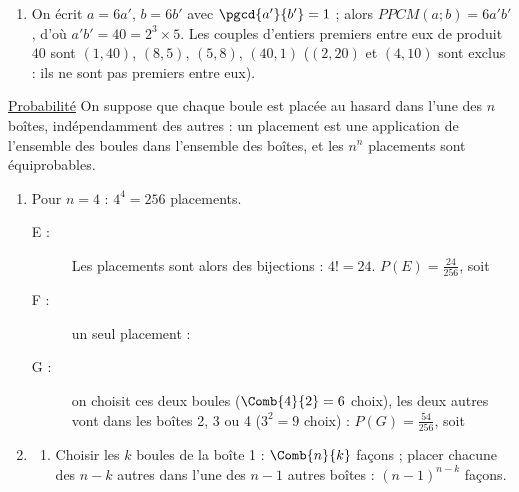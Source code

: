 \begin{description}
\begin{enumerate}
			$2^6 = 64 = 5 \times 11 + 9 \equiv 9 \pmod{11}$, donc $2^{6n+1} = 2 \times \left(2^6\right)^n \equiv 2 \times 9^n$.
			Ainsi $2^{6n+1} + 9^{n+1} \equiv 2 \times 9^n + 9 \times 9^n = 11 \times 9^n \equiv 0 \pmod{11}$.
			\par\noindent{}
		\item {}
			On écrit $a = 6a'$, $b = 6b'$ avec $\pgcd{a'}{b'} = 1$ ; alors $PPCM(a;b) = 6a'b'$, d'où $a'b' = 40 = 2^3 \times 5$.
			Les couples d'entiers premiers entre eux de produit $40$ sont $(1,40)$, $(8,5)$, $(5,8)$, $(40,1)$
			($(2,20)$ et $(4,10)$ sont exclus : ils ne sont pas premiers entre eux).
			\par\noindent{}
	\end{enumerate}
	\item[B.] \underline{Probabilité}
	On suppose que chaque boule est placée au hasard dans l'une des $n$ boîtes, indépendamment des autres : un placement est une application de l'ensemble des boules dans l'ensemble des boîtes, et les $n^n$ placements sont équiprobables.
	\begin{enumerate}
		\item Pour $n = 4$ : $4^4 = 256$ placements.
		\begin{description}
			\item[E :] 
				Les placements sont alors des bijections : $4! = 24$. $P(E) = \frac{24}{256}$, soit \par\noindent{}
			\item[F :] 
				un seul placement : \par\noindent{}
			\item[G :] 
				on choisit ces deux boules ($\Comb{4}{2} = 6$ choix), les deux autres vont dans les boîtes 2, 3 ou 4 ($3^2 = 9$ choix) :
				$P(G) = \frac{54}{256}$, soit \par\noindent{}
		\end{description}
		\item
		\begin{enumerate}
			\item {}
				Choisir les $k$ boules de la boîte 1 : $\Comb{n}{k}$ façons ; placer chacune des $n - k$ autres dans l'une des $n - 1$ autres boîtes : $(n-1)^{n-k}$ façons.

\end{enumerate}
\end{enumerate}
\end{description}

